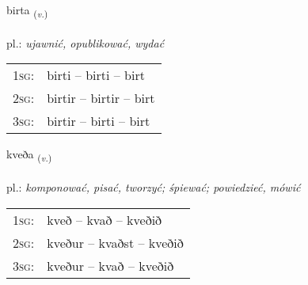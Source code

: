 \documentclass[frontgrid, backgrid]{flacards}\usepackage[]{graphicx}\usepackage[]{xcolor}
\begin{document}
\renewcommand{\flhead}{\vskip5pt \fboxsep=0pt {\small\bfseries\footnotesize Sagnorð | czasownik}}
\renewcommand{\fcfoot}{\vskip5pt \fboxsep=0pt \hspace{2pt}{\small\bfseries\footnotesize 1K}}

\renewcommand{\blhead}{\vskip5pt {\small\bfseries\footnotesize Sagnorð | czasownik }}
\renewcommand{\bcfoot}{\vskip5pt \hspace{2pt}{\small\bfseries\footnotesize 1K}}


{birta \small{\textsubscript{(\textit{v.})}} \\[1ex] %
\textphonetic{[pɪr̥ta]} \\
pl.: \emph{ujawnić, opublikować, wydać} \\  [2ex]
\renewcommand*{\arraystretch}{0.8}
\begin{tabular}{p{1cm}l}
\textsc{1sg}: & birti -- birti -- birt \\ 
\textsc{2sg}: & birtir -- birtir -- birt \\ 
\textsc{3sg}: & birtir -- birti -- birt \\ 
\end{tabular}
}

\renewcommand{\flhead}{\vskip5pt \fboxsep=0pt {\small\bfseries\footnotesize Sagnorð | czasownik}}
\renewcommand{\fcfoot}{\vskip5pt \fboxsep=0pt \hspace{2pt}{\small\bfseries\footnotesize 1K}}

\renewcommand{\blhead}{\vskip5pt {\small\bfseries\footnotesize Sagnorð | czasownik }}
\renewcommand{\bcfoot}{\vskip5pt \hspace{2pt}{\small\bfseries\footnotesize 1K}}


{kveða \small{\textsubscript{(\textit{v.})}} \\[1ex] %
\textphonetic{[kʰvɛːða]} \\
pl.: \emph{komponować, pisać, tworzyć; śpiewać; powiedzieć, mówić} \\  [2ex]
\renewcommand*{\arraystretch}{0.8}
\begin{tabular}{p{1cm}l}
\textsc{1sg}: & kveð -- kvað -- kveðið \\ 
\textsc{2sg}: & kveður -- kvaðst -- kveðið \\ 
\textsc{3sg}: & kveður -- kvað -- kveðið \\ 
\end{tabular}
}
\end{document}
